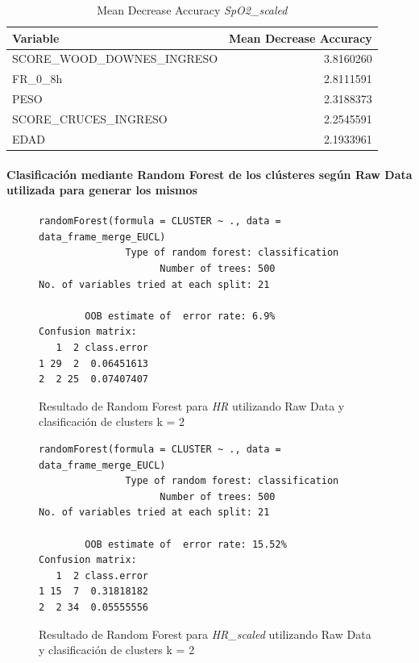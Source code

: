 \begin{table}[H]
    \centering
    \begin{tabular}{lr}
        \toprule
        \textbf{Variable} & \textbf{Mean Decrease Accuracy} \\
        \midrule
        SCORE\_WOOD\_DOWNES\_INGRESO & 3.8160260 \\
        FR\_0\_8h & 2.8111591 \\
        PESO & 2.3188373 \\
        SCORE\_CRUCES\_INGRESO & 2.2545591 \\
        EDAD & 2.1933961 \\
        \bottomrule
    \end{tabular}
    \caption{Mean Decrease Accuracy \textit{SpO2\_scaled}}
\end{table}


\paragraph{Clasificación {\color{blue}mediante} Random Forest de los clústeres según Raw Data utilizada para {\color{blue}generar} los mismos} 

\begin{figure}[H]
    \centering
    \begin{lstlisting}[frame=single, basicstyle=\small\ttfamily]
        randomForest(formula = CLUSTER ~ ., data = data_frame_merge_EUCL) 
               Type of random forest: classification
                     Number of trees: 500
No. of variables tried at each split: 21

        OOB estimate of  error rate: 6.9%
Confusion matrix:
   1  2 class.error
1 29  2  0.06451613
2  2 25  0.07407407
    \end{lstlisting}
    \caption{Resultado de Random Forest para \textit{HR} utilizando Raw Data y clasificación de clusters k = 2}\label{fig:random_forest_eucl_result_RF_1}
\end{figure}
\begin{figure}[H]
    \centering
    \begin{lstlisting}[frame=single, basicstyle=\small\ttfamily]
        randomForest(formula = CLUSTER ~ ., data = data_frame_merge_EUCL) 
               Type of random forest: classification
                     Number of trees: 500
No. of variables tried at each split: 21

        OOB estimate of  error rate: 15.52%
Confusion matrix:
   1  2 class.error
1 15  7  0.31818182
2  2 34  0.05555556
    \end{lstlisting}
    \caption{Resultado de Random Forest para \textit{HR\_scaled} utilizando Raw Data y clasificación de clusters k = 2}
    \label{fig:random_forest_eucl_result_RF_2}
\end{figure}

